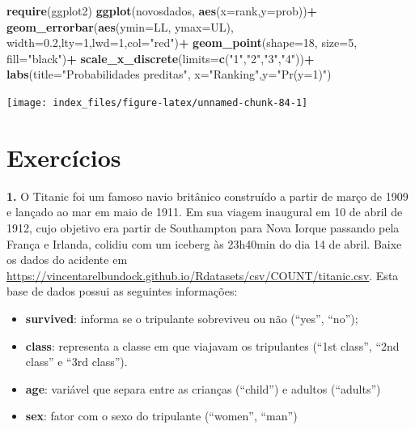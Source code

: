 \documentclass[12pt,brazil,oneside]{book}
\newenvironment{Shaded}{\begin{snugshade}}{\end{snugshade}}
\newcommand{\DataTypeTok}[1]{\textcolor[rgb]{0.13,0.29,0.53}{#1}}
\newcommand{\DecValTok}[1]{\textcolor[rgb]{0.00,0.00,0.81}{#1}}
\newcommand{\FloatTok}[1]{\textcolor[rgb]{0.00,0.00,0.81}{#1}}
\newcommand{\KeywordTok}[1]{\textcolor[rgb]{0.13,0.29,0.53}{\textbf{#1}}}
\newcommand{\NormalTok}[1]{#1}
\newcommand{\OperatorTok}[1]{\textcolor[rgb]{0.81,0.36,0.00}{\textbf{#1}}}
\newcommand{\StringTok}[1]{\textcolor[rgb]{0.31,0.60,0.02}{#1}}
\providecommand{\tightlist}{%
  \setlength{\itemsep}{0pt}\setlength{\parskip}{0pt}}
\begin{document}
\begin{Shaded}
\begin{Highlighting}[]
\KeywordTok{require}\NormalTok{(ggplot2)}
\KeywordTok{ggplot}\NormalTok{(novosdados, }\KeywordTok{aes}\NormalTok{(}\DataTypeTok{x=}\NormalTok{rank,}\DataTypeTok{y=}\NormalTok{prob))}\OperatorTok{+}
\StringTok{  }\KeywordTok{geom_errorbar}\NormalTok{(}\KeywordTok{aes}\NormalTok{(}\DataTypeTok{ymin=}\NormalTok{LL, }\DataTypeTok{ymax=}\NormalTok{UL), }\DataTypeTok{width=}\FloatTok{0.2}\NormalTok{,}\DataTypeTok{lty=}\DecValTok{1}\NormalTok{,}\DataTypeTok{lwd=}\DecValTok{1}\NormalTok{,}\DataTypeTok{col=}\StringTok{"red"}\NormalTok{)}\OperatorTok{+}
\StringTok{  }\KeywordTok{geom_point}\NormalTok{(}\DataTypeTok{shape=}\DecValTok{18}\NormalTok{, }\DataTypeTok{size=}\DecValTok{5}\NormalTok{, }\DataTypeTok{fill=}\StringTok{"black"}\NormalTok{)}\OperatorTok{+}
\StringTok{  }\KeywordTok{scale_x_discrete}\NormalTok{(}\DataTypeTok{limits=}\KeywordTok{c}\NormalTok{(}\StringTok{"1"}\NormalTok{,}\StringTok{"2"}\NormalTok{,}\StringTok{"3"}\NormalTok{,}\StringTok{"4"}\NormalTok{))}\OperatorTok{+}
\StringTok{  }\KeywordTok{labs}\NormalTok{(}\DataTypeTok{title=}\StringTok{"Probabilidades preditas"}\NormalTok{, }\DataTypeTok{x=}\StringTok{"Ranking"}\NormalTok{,}\DataTypeTok{y=}\StringTok{"Pr(y=1)"}\NormalTok{)}
\end{Highlighting}
\end{Shaded}

\begin{center}\texttt{[image: index\_files/figure-latex/unnamed-chunk-84-1]} \end{center}

\hypertarget{exercicios}{%
\section{Exercícios}\label{exercicios}}

\textbf{1.} O Titanic foi um famoso navio britânico construído a partir
de março de 1909 e lançado ao mar em maio de 1911. Em sua viagem
inaugural em 10 de abril de 1912, cujo objetivo era partir de
Southampton para Nova Iorque passando pela França e Irlanda, colidiu com
um iceberg às 23h40min do dia 14 de abril. Baixe os dados do acidente em
\url{https://vincentarelbundock.github.io/Rdatasets/csv/COUNT/titanic.csv}.
Esta base de dados possui as seguintes informações:

\begin{itemize}
\tightlist
\item
  \textbf{survived}: informa se o tripulante sobreviveu ou não (``yes'',
  ``no'');
\item
  \textbf{class}: representa a classe em que viajavam os tripulantes
  (``1st class'', ``2nd class'' e ``3rd class'').
\item
  \textbf{age}: variável que separa entre as crianças (``child'') e
  adultos (``adults'')
\item
  \textbf{sex}: fator com o sexo do tripulante (``women'', ``man'')
\end{itemize}
\end{document}

